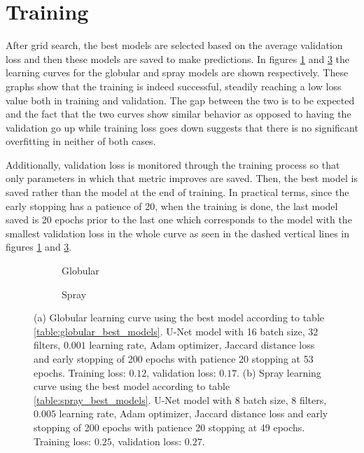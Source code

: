

\section{Training}

After grid search, the best models are selected based on the average validation loss and then these models are saved to make predictions. In figures \ref{fig:globular_loss_curve} and \ref{fig:spray_loss_curve} the learning curves for the globular and spray models are shown respectively. These graphs show that the training is indeed successful, steadily reaching a low loss value both in training and validation. The gap between the two is to be expected and the fact that the two curves show similar behavior as opposed to having the validation go up while training loss goes down suggests that there is no significant overfitting in neither of both cases.

Additionally, validation loss is monitored through the training process so that only parameters in which that metric improves are saved. Then, the best model is saved rather than the model at the end of training. In practical terms, since the early stopping has a patience of 20, when the training is done, the last model saved is 20 epochs prior to the last one which corresponds to the model with the smallest validation loss in the whole curve as seen in the dashed vertical lines in figures \ref{fig:globular_loss_curve} and \ref{fig:spray_loss_curve}.

\begin{figure}
  \begin{subfigure}[b]{\textwidth}
    
    \caption[Globular learning curve]{Globular}
    \label{fig:globular_loss_curve}
  \end{subfigure}
\vfill
  \begin{subfigure}[b]{\textwidth}
    
    \caption[Spray learning curve]{Spray}
    \label{fig:spray_loss_curve}
  \end{subfigure}
  \caption[Learning curves for globular (a) and spray (b) transfer]{(a) Globular learning curve using the best model according to table \ref{table:globular_best_models}. U-Net model with 16 batch size, 32 filters, $0.001$ learning rate, Adam optimizer, Jaccard distance loss and early stopping of 200 epochs with patience 20 stopping at 53 epochs. Training loss: $0.12$, validation loss: $0.17$. (b) Spray learning curve using the best model according to table \ref{table:spray_best_models}. U-Net model with 8 batch size, 8 filters, $0.005$ learning rate, Adam optimizer, Jaccard distance loss and early stopping of 200 epochs with patience 20 stopping at 49 epochs. Training loss: $0.25$, validation loss: $0.27$.} 
\end{figure}

